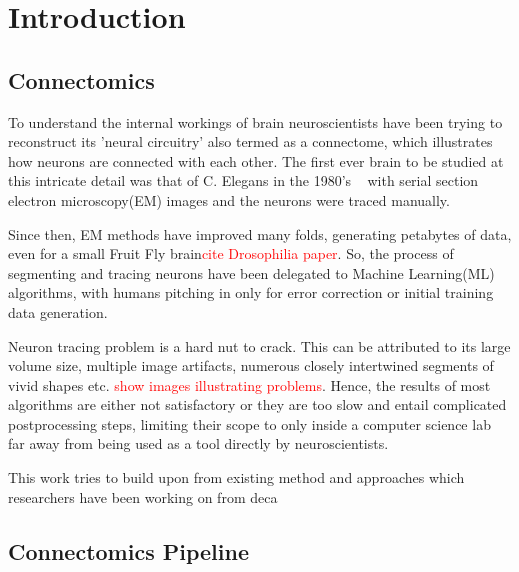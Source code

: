 
\chapter{Introduction}\label{chapter:introduction}

\section{Connectomics}
To understand the internal workings of brain neuroscientists have been trying to reconstruct its 'neural circuitry' also termed as a connectome, which illustrates how neurons are connected with each other. The first ever brain to be studied at this intricate detail was that of C. Elegans in the 1980's ~\cite{whiteCElegans} with serial section electron microscopy(EM) images and the neurons were traced manually. 

Since then, EM methods have improved many folds, generating petabytes of data, even for a small Fruit Fly brain\textcolor{red}{cite Drosophilia paper}. So, the process of segmenting and tracing neurons have been delegated to Machine Learning(ML) algorithms, with humans pitching in only for error correction or initial training data generation. 

Neuron tracing problem is a hard nut to crack. This can be attributed to its large volume size, multiple image artifacts, numerous closely intertwined segments of vivid shapes etc. \textcolor{red}{show images illustrating problems}. Hence, the results of most algorithms are either not satisfactory or they are too slow and entail complicated postprocessing steps, limiting their scope to only inside a computer science lab far away from being used as a tool directly by neuroscientists.

This work tries to build upon from existing method and approaches which researchers have been working on from deca


\section{Connectomics Pipeline}


